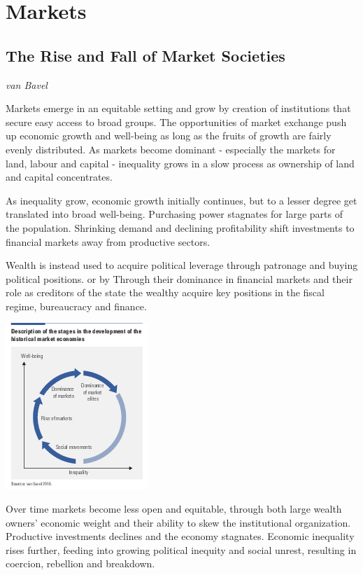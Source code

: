 \documentclass[
]{book}
\begin{document}
\hypertarget{markets}{%
\chapter{Markets}\label{markets}}

\hypertarget{the-rise-and-fall-of-market-societies}{%
\section{The Rise and Fall of Market Societies}\label{the-rise-and-fall-of-market-societies}}

\emph{van Bavel}

Markets emerge in an equitable setting and
grow by creation of institutions that
secure easy access to broad groups.
The opportunities of market exchange push
up economic growth and well-being as long as the
fruits of growth are fairly evenly distributed.
As markets become dominant - especially the
markets for land, labour and capital -
inequality grows in a slow process as
ownership of land and capital concentrates.

As inequality grow, economic growth initially continues,
but to a lesser degree get translated into broad well-being.
Purchasing power stagnates for large parts of the population.
Shrinking demand and declining profitability
shift investments to financial markets away from productive sectors.

Wealth is instead used to acquire political leverage through
patronage and buying political positions. or by
Through their dominance in financial markets and their role
as creditors of the state
the wealthy acquire key positions in the fiscal regime,
bureaucracy and finance.

\includegraphics{fig/marketcycle.png}

Over time markets become less open and
equitable, through both large wealth owners'
economic weight and their ability to skew the
institutional organization.
Productive investments declines and the economy stagnates.
Economic inequality rises further,
feeding into growing political inequity and social unrest,
resulting in coercion, rebellion and breakdown.
\end{document}
